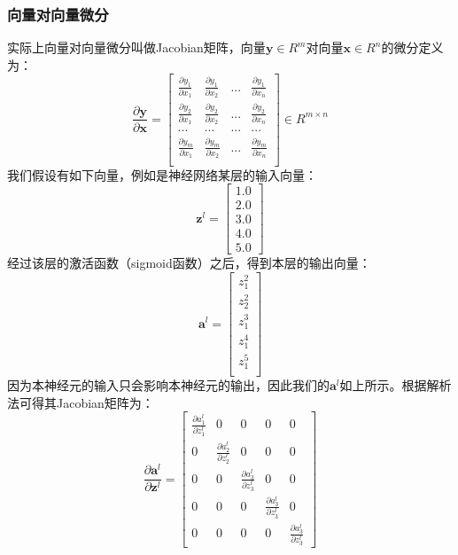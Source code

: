 \documentclass[UTF8]{article}
\begin{document}
\subsubsection{向量对向量微分}
实际上向量对向量微分叫做Jacobian矩阵，向量$\boldsymbol{y} \in R^{m}$对向量$\boldsymbol{x} \in R^{n}$的微分定义为：
\begin{equation}
\frac{ \partial{\boldsymbol{y}} }{ \partial{\boldsymbol{x}} } = \begin{bmatrix}
\frac{\partial{y_{1}}}{\partial{x_{1}}} & \frac{\partial{y_{1}}}{\partial{x_{2}}} & ... & \frac{\partial{y_{1}}}{\partial{x_{n}}} \\
\frac{\partial{y_{2}}}{\partial{x_{1}}} & \frac{\partial{y_{2}}}{\partial{x_{2}}} & ... & \frac{\partial{y_{2}}}{\partial{x_{n}}} \\
... & ... & ... & ... \\
\frac{\partial{y_{m}}}{\partial{x_{1}}} & \frac{\partial{y_{m}}}{\partial{x_{2}}} & ... & \frac{\partial{y_{m}}}{\partial{x_{n}}} \\
\end{bmatrix} \in R^{m \times n}
\label{autodif-vector-vector-gradient-def}
\end{equation}
我们假设有如下向量，例如是神经网络某层的输入向量：
\begin{equation}
\boldsymbol{z}^{l}=\begin{bmatrix}
1.0 \\
2.0 \\
3.0 \\
4.0 \\
5.0
\end{bmatrix}
\label{autodif-z-l}
\end{equation}
经过该层的激活函数（sigmoid函数）之后，得到本层的输出向量：
\begin{equation}
\boldsymbol{a}^{l}=\begin{bmatrix}
z_{1}^{2} \\
z_{2}^{2} \\
z_{1}^{3} \\
z_{1}^{4} \\
z_{1}^{5} \\
\end{bmatrix}
\label{autodif-a-l}
\end{equation}
因为本神经元的输入只会影响本神经元的输出，因此我们的$\boldsymbol{a}^{l}$如上所示。根据解析法可得其Jacobian矩阵为：
\begin{equation}
\frac{ \partial{\boldsymbol{a}^{l}} }{ \partial{\boldsymbol{z}^{l}} }=\begin{bmatrix}
\frac{ \partial{a}_{1}^{l} }{ \partial{z}_{1}^{l} } & 0 & 0 & 0 & 0 \\
0 & \frac{ \partial{a}_{2}^{l} }{ \partial{z}_{2}^{l} }  & 0 & 0 & 0 \\
0 & 0 & \frac{ \partial{a}_{3}^{l} }{ \partial{z}_{3}^{l} }  & 0 & 0 \\
0 & 0 & 0 & \frac{ \partial{a}_{3}^{l} }{ \partial{z}_{3}^{l} }  & 0 \\
0 & 0 & 0 & 0 & \frac{ \partial{a}_{3}^{l} }{ \partial{z}_{3}^{l} } 
\end{bmatrix}
\label{autodif-vector-vector-gradient-demo}
\end{equation}
\end{document}
